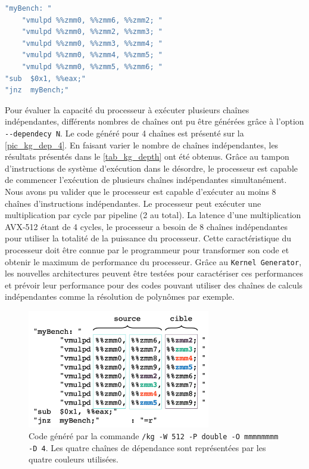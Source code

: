     
    
    
\begin{minipage}{0.97\linewidth}         \begin{lstlisting}[label=lst_dep1,language=C, caption=Code généré par la commande \texttt{/kg -W 512 -P double -O mmmmm -D 1}. Chaque instruction utilise le résultat produit par l'instruction précédente.]
"myBench: " 
	"vmulpd %%zmm0, %%zmm6, %%zmm2; "
	"vmulpd %%zmm0, %%zmm2, %%zmm3; "
	"vmulpd %%zmm0, %%zmm3, %%zmm4; "
	"vmulpd %%zmm0, %%zmm4, %%zmm5; "
	"vmulpd %%zmm0, %%zmm5, %%zmm6; "
"sub  $0x1, %%eax;"
"jnz  myBench;"
\end{lstlisting} \end{minipage}

     
    Pour évaluer la capacité du processeur à exécuter plusieurs chaînes indépendantes, différents nombres de chaînes ont pu être générées grâce à l'option \verb|--dependecy N|. Le code généré pour 4 chaînes est présenté sur la \autoref{pic_kg_dep_4}. En faisant varier le nombre de chaînes indépendantes, les résultats présentés dans le \autoref{tab_kg_depth} ont été obtenus. Grâce au tampon d'instructions de système d'exécution dans le désordre, le processeur est capable de commencer l'exécution de plusieurs chaînes indépendantes simultanément. Nous avons pu valider que le processeur est capable d'exécuter au moins 8 chaînes d'instructions indépendantes. Le processeur peut exécuter une multiplication par cycle par pipeline (2 au total). La latence d'une multiplication AVX-512 étant de 4 cycles, le processeur a besoin de 8 chaînes indépendantes pour utiliser la totalité de la puissance du processeur. Cette caractéristique du processeur doit être connue par le programmeur pour transformer son code et obtenir le maximum de performance du processeur. Grâce au \verb|Kernel Generator|, les nouvelles architectures peuvent être testées pour caractériser ces performances et prévoir leur performance pour des codes pouvant utiliser des chaînes de calculs indépendantes comme la résolution de polynômes par exemple. 
    
         \begin{figure}
            \center
            \includegraphics[width=8cm]{images/kg_dep_4.png}
            \caption{\label{pic_kg_dep_4} Code généré par la commande \texttt{/kg -W 512 -P double -O mmmmmmmm -D 4}. Les quatre chaînes de dépendance sont représentées par les quatre couleurs utilisées.}
        \end{figure}

